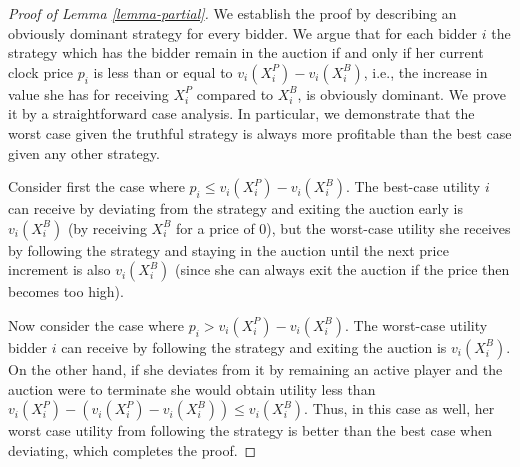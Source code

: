 
\begin{proof}[Proof of Lemma \ref{lemma-partial}]
    We establish the proof by describing an obviously dominant strategy for every bidder.
We argue that for each bidder $i$ the strategy which has the bidder remain in the auction if and only if her current clock price $p_i$ is less than or equal to $v_i(X_i^{P}) - v_i(X_i^{B})$, i.e., the increase in value she has for receiving $X_i^{P}$ compared to $X_i^{B}$, is obviously dominant. 
We prove it by a straightforward case analysis. In particular, we demonstrate that the worst case given the truthful strategy is always more profitable than the best case given any other strategy. 

Consider first the case where $p_i \leq v_i(X_i^{P}) - v_i(X_i^{B})$.  The best-case utility $i$ can receive by deviating from the strategy and exiting the auction early is $v_i(X_i^{B})$ (by receiving $X_i^{B}$ for a price of $0$), but the worst-case utility she receives by following the strategy and staying in the auction until the next price increment is also $v_i(X_i^{B})$ (since she can always exit the auction if the price then becomes too high).  

Now consider the case where $p_i > v_i(X_i^{P}) - v_i(X_i^{B})$.  The worst-case utility bidder $i$ can receive by following the strategy and exiting the auction is $v_i(X_i^{B})$. 
On the other hand, if she deviates from it by remaining an active player and the auction were to terminate she would obtain utility 
less than  $v_i(X_i^{P}) - (v_i(X_i^{P}) - v_i(X_i^B)) \leq v_i(X_i^B)$.  Thus, in this case as well, her worst case utility from following the strategy is better than the best case when deviating, which completes the proof.
\end{proof}


